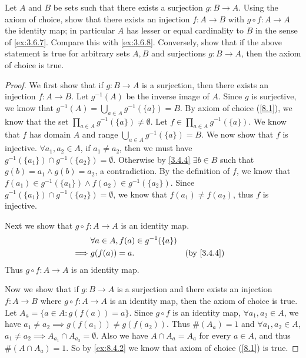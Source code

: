 \begin{ex}\label{ex:8.4.3}
  Let \(A\) and \(B\) be sets such that there exists a surjection \(g : B \to A\).
  Using the axiom of choice, show that there exists an injection \(f: A \to B\) with \(g \circ f : A \to A\) the identity map;
  in particular \(A\) has lesser or equal cardinality to \(B\) in the sense of \cref{ex:3.6.7}.
  Compare this with \cref{ex:3.6.8}.
  Conversely, show that if the above statement is true for arbitrary sets \(A, B\) and surjections \(g : B \to A\), then the axiom of choice is true.
\end{ex}

\begin{proof}
  We first show that if \(g : B \to A\) is a surjection, then there exists an injection \(f : A \to B\).
  Let \(g^{-1}(A)\) be the inverse image of \(A\).
  Since \(g\) is surjective, we know that \(g^{-1}(A) = \bigcup_{a \in A} g^{-1}(\{a\}) = B\).
  By axiom of choice (\cref{8.1}), we know that the set \(\prod_{a \in A} g^{-1}(\{a\}) \neq \emptyset\).
  Let \(f \in \prod_{a \in A} g^{-1}(\{a\})\).
  We know that \(f\) has domain \(A\) and range \(\bigcup_{a \in A} g^{-1}(\{a\}) = B\).
  We now show that \(f\) is injective.
  \(\forall a_1, a_2 \in A\), if \(a_1 \neq a_2\), then we must have \(g^{-1}(\{a_1\}) \cap g^{-1}(\{a_2\}) = \emptyset\).
  Otherwise by \cref{3.4.4} \(\exists b \in B\) such that \(g(b) = a_1 \land g(b) = a_2\), a contradiction.
  By the definition of \(f\), we know that \(f(a_1) \in g^{-1}(\{a_1\}) \land f(a_2) \in g^{-1}(\{a_2\})\).
  Since \(g^{-1}(\{a_1\}) \cap g^{-1}(\{a_2\}) = \emptyset\), we know that \(f(a_1) \neq f(a_2)\), thus \(f\) is injective.

  Next we show that \(g \circ f : A \to A\) is an identity map.
  \begin{align*}
             & \forall a \in A, f(a) \in g^{-1}(\{a\})                 \\
    \implies & g(f(a)) = a.                            &  & \by{3.4.4}
  \end{align*}
  Thus \(g \circ f : A \to A\) is an identity map.

  Now we show that if \(g : B \to A\) is a surjection and there exists an injection \(f : A \to B\) where \(g \circ f : A \to A\) is an identity map, then the axiom of choice is true.
  Let \(A_a = \{a \in A : g(f(a)) = a\}\).
  Since \(g \circ f\) is an identity map, \(\forall a_1, a_2 \in A\), we have \(a_1 \neq a_2 \implies g(f(a_1)) \neq g(f(a_2))\).
  Thus \(\#(A_a) = 1\) and \(\forall a_1, a_2 \in A\), \(a_1 \neq a_2 \implies A_{a_1} \cap A_{a_2} = \emptyset\).
  Also we have \(A \cap A_a = A_a\) for every \(a \in A\), and thus \(\#(A \cap A_a) = 1\).
  So by \cref{ex:8.4.2} we know that axiom of choice (\cref{8.1}) is true.
\end{proof}